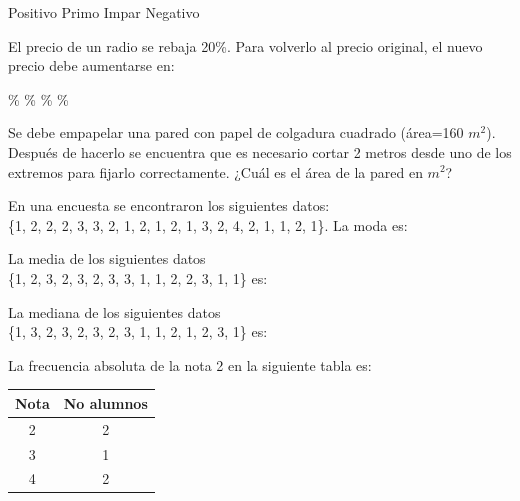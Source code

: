 \documentclass[10pt,letterpaper,addpoints]{exam}
\begin{document}
\begin{multicols}{2}
\begin{questions}
\begin{choices}
\CorrectChoice Positivo
\choice Primo
\choice Impar
\choice Negativo
\end{choices}
\question El precio de un radio se rebaja 20\%. Para volverlo al precio original, el nuevo precio debe aumentarse en:

\begin{oneparchoices}
\%
\%
\%
\%
\end{oneparchoices}
\question Se debe empapelar una pared con papel de colgadura cuadrado (área=160 $m^{2}$). Después de hacerlo se encuentra que es necesario cortar 2 metros desde uno de los extremos para fijarlo correctamente. ¿Cuál es el área de la pared en $m^{2}$?

\begin{oneparchoices}
\end{oneparchoices}
\question En una encuesta se encontraron los siguientes datos:\\ \{1, 2, 2, 2, 3, 3, 2, 1, 2, 1, 2, 1, 3, 2, 4, 2, 1, 1, 2, 1\}. La moda es:

\begin{oneparchoices}
\end{oneparchoices}
\question La media de los siguientes datos\\ \{1, 2, 3, 2, 3, 2, 3, 3, 1, 1, 2, 2, 3, 1, 1\} es:

\begin{oneparchoices}
\end{oneparchoices}
\question La mediana de los siguientes datos\\ \{1, 3, 2, 3, 2, 3, 2, 3, 1, 1, 2, 1, 2, 3, 1\} es:

\begin{oneparchoices}
\end{oneparchoices}
\question La frecuencia absoluta de la nota 2 en la siguiente tabla es:

\begin{center}
\begin{tabular}{|c|c|}
\hline 
Nota & No alumnos \\ 
\hline 
2 & 2 \\ 
\hline 
3 & 1 \\ 
\hline 
4 & 2 \\ 
\hline 
\end{tabular} 
\end{center}


\end{questions}
\end{multicols}
\end{document}
